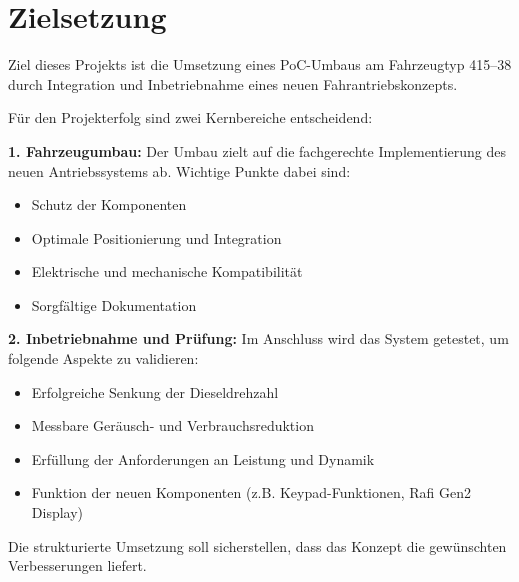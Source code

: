 \documentclass[a4paper, 12pt]{article} %
\begin{document}
\section{Zielsetzung}
\begin{spacing}{1.5}  %
    \fontsize{14pt}{14pt}\selectfont  %

    Ziel dieses Projekts ist die Umsetzung eines \ac{PoC}-Umbaus 
    am Fahrzeugtyp 415–38 durch Integration und Inbetriebnahme 
    eines neuen Fahrantriebskonzepts.
    
    Für den Projekterfolg sind zwei Kernbereiche entscheidend:
    
    \textbf{1. Fahrzeugumbau:}
    Der Umbau zielt auf die fachgerechte Implementierung des neuen Antriebssystems ab. 
    Wichtige Punkte dabei sind:
    
    \begin{itemize}
        \item Schutz der Komponenten
        \item Optimale Positionierung und Integration
        \item Elektrische und mechanische Kompatibilität
        \item Sorgfältige Dokumentation
    \end{itemize}
    
    \textbf{2. Inbetriebnahme und Prüfung:}
    Im Anschluss wird das System getestet, um folgende Aspekte zu validieren:
    
    \begin{itemize}
        \item Erfolgreiche Senkung der Dieseldrehzahl
        \item Messbare Geräusch- und Verbrauchsreduktion
        \item Erfüllung der Anforderungen an Leistung und Dynamik
        \item Funktion der neuen Komponenten (z.B. Keypad-Funktionen, Rafi Gen2 Display)
    \end{itemize}
    
    Die strukturierte Umsetzung soll sicherstellen, 
    dass das Konzept die gewünschten Verbesserungen liefert.
    
\end{spacing}
\end{document}
